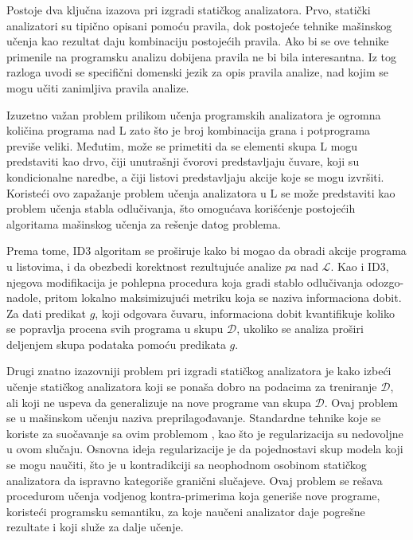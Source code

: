 \documentclass[a4paper]{article}
\theoremstyle{definition}
\begin{document}
{%
Postoje dva ključna izazova pri izgradi statičkog analizatora. Prvo, statički 
analizatori su tipično opisani pomoću pravila, dok postojeće tehnike mašinskog 
učenja kao rezultat daju kombinaciju postojećih pravila. Ako bi se ove tehnike 
primenile na programsku analizu \cite{predictingProgramProperties} dobijena 
pravila ne bi bila interesantna. Iz tog razloga uvodi se specifični domenski 
jezik za opis pravila analize, nad kojim se mogu učiti zanimljiva pravila analize.


Izuzetno važan problem prilikom učenja programskih analizatora je ogromna količina 
programa nad L zato što je broj kombinacija grana i potprograma previše veliki. 
Međutim, može se primetiti da se elementi skupa L mogu predstaviti kao drvo, čiji 
unutrašnji čvorovi predstavljaju čuvare, koji su kondicionalne naredbe, a čiji 
listovi predstavljaju akcije koje se mogu izvršiti. Koristeći ovo zapažanje problem 
učenja analizatora u L se može predstaviti kao problem učenja stabla odlučivanja, 
što omogućava korišćenje postojećih algoritama mašinskog učenja za 
rešenje datog problema.

Prema tome, ID3 \cite{id3} algoritam se proširuje kako bi mogao da obradi akcije 
programa u listovima, i da obezbedi korektnost rezultujuće analize $pa$ nad 
$\mathcal{L}$. Kao i ID3, njegova modifikacija je pohlepna procedura koja gradi 
stablo odlučivanja odozgo-nadole, pritom lokalno maksimizujući metriku koja se 
naziva informaciona dobit. Za dati predikat $g$, koji odgovara čuvaru, 
informaciona dobit kvantifikuje koliko se popravlja procena svih programa u 
skupu $\mathcal{D}$, ukoliko se analiza proširi deljenjem skupa podataka 
pomoću predikata $g$.


Drugi znatno izazovniji problem pri izgradi statičkog analizatora je 
kako izbeći učenje statičkog analizatora koji se ponaša dobro 
na podacima za treniranje $\mathcal{D}$, ali koji ne uspeva da 
generalizuje na nove programe van skupa $\mathcal{D}$. Ovaj problem se u mašinskom 
učenju naziva preprilagođavanje. Standardne tehnike koje se koriste za suočavanje 
sa ovim problemom \cite{statisticalLearningTheory}, kao što je regularizacija su 
nedovoljne u ovom slučaju. Osnovna ideja regularizacije je da pojednostavi skup 
modela koji se mogu naučiti, što je u kontradikciji sa neophodnom osobinom 
statičkog analizatora da ispravno kategoriše granični slučajeve. Ovaj problem 
se rešava procedurom učenja vodjenog kontra-primerima koja generiše nove 
programe, koristeći programsku semantiku, za koje naučeni analizator daje 
pogrešne rezultate i koji služe za dalje učenje. 


}
\end{document}
